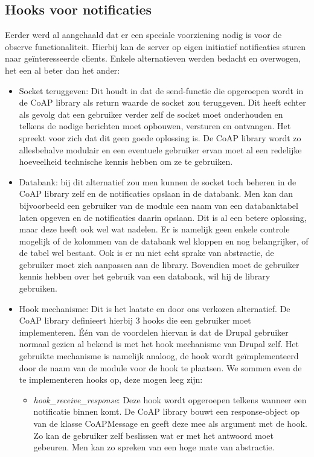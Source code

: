 \subsection{Hooks voor notificaties} \label{observe_hooks}

Eerder werd al aangehaald dat er een speciale voorziening nodig is voor de observe functionaliteit. Hierbij kan de server op eigen initiatief notificaties sturen naar ge\"{i}nteresseerde clients. Enkele alternatieven werden bedacht en overwogen, het een al beter dan het ander:
\begin{itemize}
\item Socket teruggeven: Dit houdt in dat de send-functie die opgeroepen wordt in de CoAP library als return waarde de socket zou teruggeven. Dit heeft echter als gevolg dat een gebruiker verder zelf de socket moet onderhouden en telkens de nodige berichten moet opbouwen, versturen en ontvangen. Het spreekt voor zich dat dit geen goede oplossing is. De CoAP library wordt zo allesbehalve modulair en een eventuele gebruiker ervan moet al een redelijke hoeveelheid technische kennis hebben om ze te gebruiken.
\item Databank: bij dit alternatief zou men kunnen de socket toch beheren in de CoAP library zelf en de notificaties opslaan in de databank. Men kan dan bijvoorbeeld een gebruiker van de module een naam van een databanktabel laten opgeven en de notificaties daarin opslaan. Dit is al een betere oplossing, maar deze heeft ook wel wat nadelen. Er is namelijk geen enkele controle mogelijk of de kolommen van de databank wel kloppen en nog belangrijker, of de tabel wel bestaat. Ook is er nu niet echt sprake van abstractie, de gebruiker moet zich aanpassen aan de library. Bovendien moet de gebruiker kennis hebben over het gebruik van een databank, wil hij de library gebruiken.
\item Hook mechanisme: Dit is het laatste en door ons verkozen alternatief. De CoAP library definieert hierbij 3 hooks die een gebruiker moet implementeren. \'{E}\'{e}n van de voordelen hiervan is dat de Drupal gebruiker normaal gezien al bekend is met het hook mechanisme van Drupal zelf. Het gebruikte mechanisme is namelijk analoog, de hook wordt ge\"{i}mplementeerd door de naam van de module voor de hook te plaatsen. We sommen even de te implementeren hooks op, deze mogen leeg zijn:
\begin{itemize}
\item \textit{hook\_receive\_response}: Deze hook wordt opgeroepen telkens wanneer een notificatie binnen komt. De CoAP library bouwt een response-object op van de klasse CoAPMessage en geeft deze mee als argument met de hook. Zo kan de gebruiker zelf beslissen wat er met het antwoord moet gebeuren. Men kan zo spreken van een hoge mate van abstractie.

\end{itemize}
\end{itemize}
